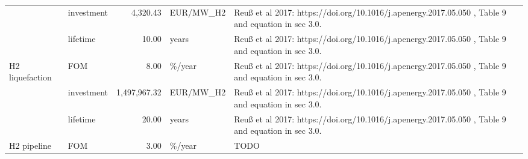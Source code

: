 \begin{longtable}{p{5cm}p{3cm}rp{3cm}p{11cm}}
                      & investment &       4,320.43 &                         EUR/MW\_H2 &                                                                                                                                                                                                                                   Reuß et al 2017: https://doi.org/10.1016/j.apenergy.2017.05.050 , Table 9 and equation in sec 3.0. \\
                      & lifetime &          10.00 &                             years &                                                                                                                                                                                                                                   Reuß et al 2017: https://doi.org/10.1016/j.apenergy.2017.05.050 , Table 9 and equation in sec 3.0. \\
H2 liquefaction & FOM &           8.00 &                            \%/year &                                                                                                                                                                                                                                   Reuß et al 2017: https://doi.org/10.1016/j.apenergy.2017.05.050 , Table 9 and equation in sec 3.0. \\
                      & investment &   1,497,967.32 &                         EUR/MW\_H2 &                                                                                                                                                                                                                                   Reuß et al 2017: https://doi.org/10.1016/j.apenergy.2017.05.050 , Table 9 and equation in sec 3.0. \\
                      & lifetime &          20.00 &                             years &                                                                                                                                                                                                                                   Reuß et al 2017: https://doi.org/10.1016/j.apenergy.2017.05.050 , Table 9 and equation in sec 3.0. \\
H2 pipeline & FOM &           3.00 &                            \%/year &                                                                                                                                                                                                                                                                                                                                 TODO \\

\end{longtable}
